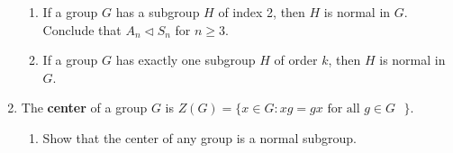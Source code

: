 \documentclass[fleqn,12pt]{article}
\newcommand{\<}{\ensuremath{\langle}}
\renewcommand{\>}{\ensuremath{\rangle}}
\begin{document}
\begin{enumerate}[{\bf 1.}]
\begin{enumerate}
\item If a group $G$ has a subgroup $H$ of index 2, then $H$ is
normal in $G$. \\
Conclude that $A_n \triangleleft S_n$ for $n \geq 3$.

\item 
If a group $G$ has exactly one subgroup $H$ of order $k$, then
$H$ is normal in $G$. 

\end{enumerate}



\newpage

\item The {\bf center} of a group $G$ is
$Z(G) = \{ x \in G : xg = gx \text{ for all $g \in G$ }\}$.

\begin{enumerate}
 \item
Show that the center of any group is a normal subgroup.
 \vskip7cm


\end{enumerate}
\end{enumerate}
\end{document}
